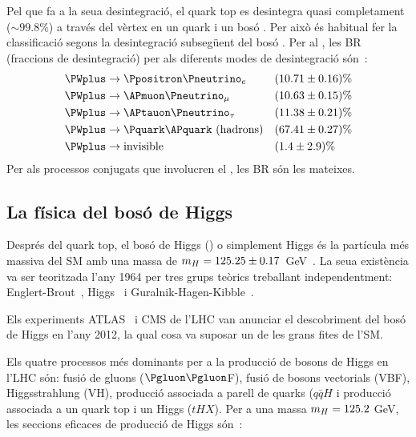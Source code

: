 Pel que fa a la seua desintegració,  el quark top es desintegra quasi completament ($\sim 99.8\%$) 
a través del vèrtex \Wtb en un quark \Pbottom i un bosó \PW. Per això és habitual fer la classificació
segons la desintegració subsegüent del bosó \PW.  Per al \PWplus, les BR (fraccions de desintegració) 
per als diferents modes de desintegració són~\cite{Workman:2022ynf}:
\begin{align*}
	\PWplus &\rightarrow \Ppositron \Pneutrino_{e} 			&& (10.71 \pm 0.16)\% \\
	\PWplus &\rightarrow \APmuon \Pneutrino_{\mu} 			&& (10.63 \pm 0.15)\% \\
	\PWplus &\rightarrow \APtauon \Pneutrino_{\tau} 			&& (11.38 \pm 0.21)\% \\
	\PWplus &\rightarrow \Pquark \APquark \textrm{ (hadrons)}	&& (67.41 \pm 0.27)\% \\
	\PWplus &\rightarrow \textrm{invisible}					&& (1.4 \pm 2.9)\% 
\end{align*} 
Per als processos conjugats que involucren el \PWminus, les BR són les mateixes.


\subsection{La física del bosó de Higgs}
\label{sec:resum:FisicaHiggs}
Després del quark top, el bosó de Higgs (\PH) o simplement Higgs és la partícula més massiva del 
SM amb una massa de $m_{H} = 125.25 \pm 0.17$~GeV~\cite{Workman:2022ynf}. La seua existència va ser 
teoritzada l'any 1964 per tres grups teòrics treballant independentment: Englert-Brout~\cite{PhysRevLett.13.321}, 
Higgs~\cite{PhysRevLett.13.508} i Guralnik-Hagen-Kibble~\cite{PhysRevLett.13.585}. 

Els experiments ATLAS~\cite{20121_ATLAS_HiggsDiscovery} i CMS 
\cite{201230_CMS_HiggsDiscovery} de l'LHC van anunciar el descobriment
del bosó de Higgs en l'any 2012, la qual cosa va suposar un de les grans fites de l'SM.

Els quatre processos més dominants per a la producció de bosons de Higgs en l'LHC
són:  fusió de gluons ($\Pgluon \Pgluon$F), fusió de bosons vectorials (VBF), Higgsstrahlung 
(VH), producció associada a parell de quarks ($q\bar{q}H$ i producció associada a un 
quark top i un Higgs ($tHX$). Per a una massa $m_{H} = 125.2$ GeV, les seccions eficaces de 
producció de Higgs són~\cite{LHCHiggsCrossSectionWorkingGroup:2016ypw}:


